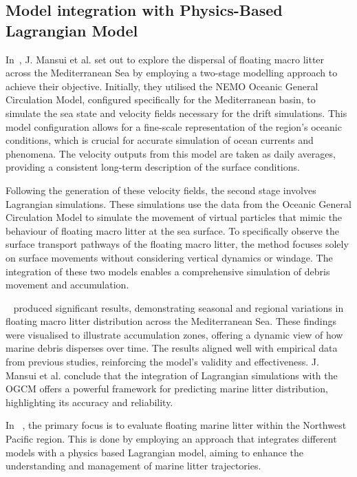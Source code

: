 \subsection{Model integration with Physics-Based Lagrangian Model}
\label{subsec:2.2.3}

In~\cite{45}, J. Mansui et al. set out to explore the dispersal of floating macro litter across the Mediterranean Sea by employing a two-stage modelling approach to achieve their objective. Initially, they utilised the NEMO Oceanic General Circulation Model, configured specifically for the Mediterranean basin, to simulate the sea state and velocity fields necessary for the drift simulations. This model configuration allows for a fine-scale representation of the region's oceanic conditions, which is crucial for accurate simulation of ocean currents and phenomena. The velocity outputs from this model are taken as daily averages, providing a consistent long-term description of the surface conditions.

Following the generation of these velocity fields, the second stage involves Lagrangian simulations. These simulations use the data from the Oceanic General Circulation Model to simulate the movement of virtual particles that mimic the behaviour of floating macro litter at the sea surface.  To specifically observe the surface transport pathways of the floating macro litter, the method focuses solely on surface movements without considering vertical dynamics or windage. The integration of these two models enables a comprehensive simulation of debris movement and accumulation. 

~\cite{45} produced significant results, demonstrating seasonal and regional variations in floating macro litter distribution across the Mediterranean Sea. These findings were visualised to illustrate accumulation zones, offering a dynamic view of how marine debris disperses over time. The results aligned well with empirical data from previous studies, reinforcing the model's validity and effectiveness. J. Mansui et al. conclude that the integration of Lagrangian simulations with the OGCM offers a powerful framework for predicting marine litter distribution, highlighting its accuracy and reliability.\newline

In ~\cite{46}, the primary focus is to evaluate floating marine litter within the Northwest Pacific region. This is done by employing an approach that integrates different models with a physics based Lagrangian model, aiming to enhance the understanding and management of marine litter trajectories.


